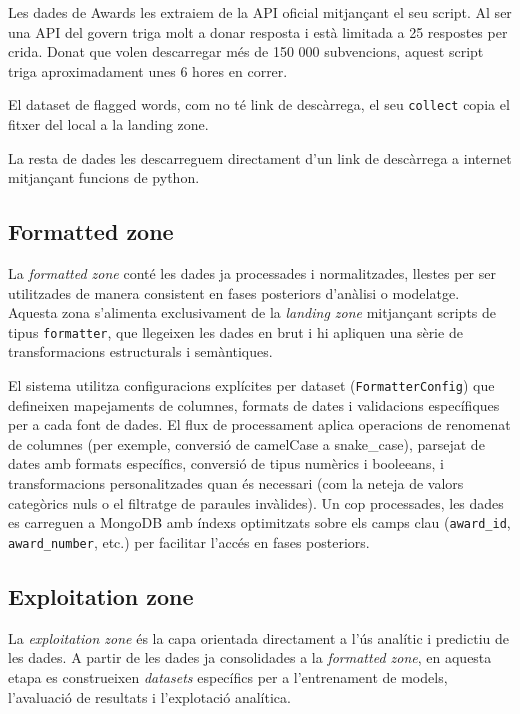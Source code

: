 \documentclass[12pt, a4paper]{article}
\begin{document}
Les dades de Awards les extraiem de la API oficial mitjançant el seu script. Al ser una API del govern triga molt a donar resposta i està limitada a 25 respostes per crida. Donat que volen descarregar més de 150 000 subvencions, aquest script triga aproximadament unes 6 hores en correr. 

El dataset de flagged words, com no té link de descàrrega, el seu \texttt{collect} copia el fitxer del local a la landing zone.

La resta de dades les descarreguem directament d'un link de descàrrega a internet mitjançant funcions de python.

\subsection{Formatted zone}

La \textit{formatted zone} conté les dades ja processades i normalitzades, llestes per ser utilitzades de manera consistent en fases posteriors d'anàlisi o modelatge. Aquesta zona s'alimenta exclusivament de la \textit{landing zone} mitjançant scripts de tipus \texttt{formatter}, que llegeixen les dades en brut i hi apliquen una sèrie de transformacions estructurals i semàntiques.

El sistema utilitza configuracions explícites per dataset (\texttt{FormatterConfig}) que defineixen mapejaments de columnes, formats de dates i validacions específiques per a cada font de dades. El flux de processament aplica operacions de renomenat de columnes (per exemple, conversió de camelCase a snake\_case), parsejat de dates amb formats específics, conversió de tipus numèrics i booleeans, i transformacions personalitzades quan és necessari (com la neteja de valors categòrics nuls o el filtratge de paraules invàlides). Un cop processades, les dades es carreguen a MongoDB amb índexs optimitzats sobre els camps clau (\texttt{award\_id}, \texttt{award\_number}, etc.) per facilitar l'accés en fases posteriors.

\subsection{Exploitation zone}

La \textit{exploitation zone} és la capa orientada directament a l'ús analític i predictiu de les dades. A partir de les dades ja consolidades a la \textit{formatted zone}, en aquesta etapa es construeixen \textit{datasets} específics per a l'entrenament de models, l'avaluació de resultats i l'explotació analítica.
\end{document}
